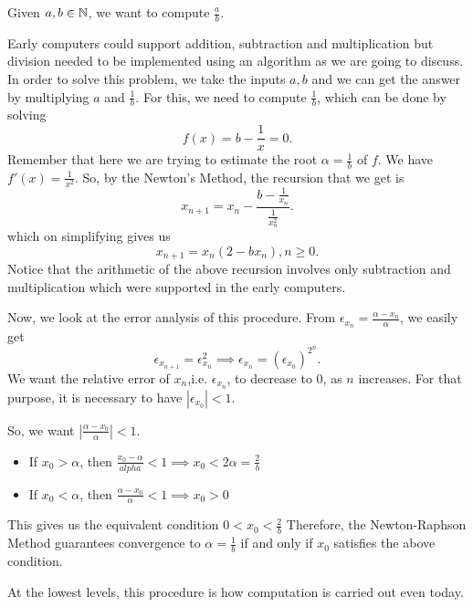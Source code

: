 \begin{example}
	Given $a,b \in \mathbb{N}$, we want to compute $\frac{a}{b}$.
	
	Early computers could support addition, subtraction and multiplication but division needed to be implemented using an algorithm as we are going to discuss.
	In order to solve this problem, we take the inputs $a,b$ and we can get the answer by multiplying  $a$ and  $\frac{1}{b}$. For this, we need to compute $\frac{1}{b}$, which can be done by solving 
	\[
	f(x) = b - \frac{1}{x} = 0
	.\] 
	Remember that here we are trying to estimate the root $\alpha = \frac{1}{b}$ of $f$. 
	We have $f'(x) = \frac{1}{x^2}$. So, by the Newton's Method, the recursion that we get is 
	\[
		x_{n+1} = x_n - \frac{b-\frac{1}{x_n}}{\frac{1}{x_n^2}}
	.\] 
	which on simplifying gives us
	\[
		x_{n+1} = x_n\left( 2-bx_n \right), n \geq 0 
	.\] 
	Notice that the arithmetic of the above recursion involves only subtraction and multiplication which were supported in the early computers.

	Now, we look at the error analysis of this procedure.
	From $\epsilon_{x_n} = \frac{\alpha-x_n}{\alpha}$, we easily get
	 \[
	 \epsilon_{x_{n+1}} = \epsilon_{x_n}^2 \implies \epsilon_{x_n} = \left( \epsilon_{x_0} \right)^{2^n} 
	.\] 
	We want the relative error of $x_n$,i.e. $\epsilon_{x_n}$, to decrease to $0$, as $n$ increases.  For that purpose, it is necessary to have $|\epsilon_{x_0}| < 1$.

	So, we want $|\frac{\alpha - x_0}{\alpha}| < 1$.
	\begin{itemize}
		\item If $x_0 > \alpha$, then  $\frac{x_0-\alpha}{alpha} < 1 \implies x_0 < 2\alpha = \frac{2}{b}$\\
		\item If $ x_0 < \alpha$, then $\frac{\alpha - x_0}{\alpha} < 1 \implies x_0 > 0$
	\end{itemize}
	This gives us the equivalent condition $0 < x_0 < \frac{2}{b}$ 
	Therefore, the Newton-Raphson Method guarantees convergence to $\alpha = \frac{1}{b}$ if and only if $x_0$ satisfies the above condition.

	At the lowest levels, this procedure is how computation is carried out even today.
\end{example}